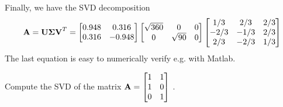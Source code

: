 \documentclass[a4paper]{article}
\numberwithin{equation}{section} %
\newcommand{\B}[1]{\textbf{\textup{#1}}} %
\begin{document}
\begin{TheSolution}
Finally, we have the SVD decomposition
\[
\B{A}=\B{U}\boldsymbol{\Sigma}\B{V}^T=\begin{bmatrix} 0.948 & 0.316\\0.316 & -0.948\end{bmatrix}\begin{bmatrix}\sqrt{360} & 0 & 0\\0 & \sqrt{90} & 0\end{bmatrix}\begin{bmatrix}1/3 & 2/3 &2/3\\-2/3&-1/3&2/3\\2/3&-2/3&1/3 \end{bmatrix}
\]
The last equation is easy to numerically verify e.g. with Matlab.
\end{TheSolution}


\begin{exmp}
Compute the SVD of the matrix $\B{A}=\begin{bmatrix}1 & 1\\1& 0\\0 & 1 \end{bmatrix}$ \cite{pres_bingham}.

\end{exmp}
\end{document}

